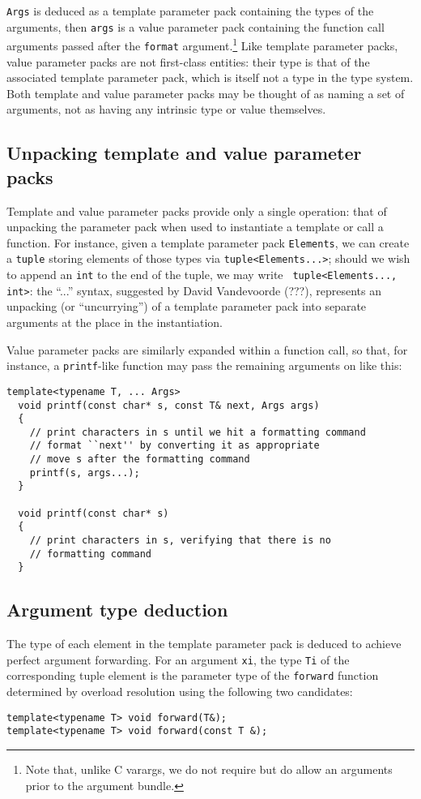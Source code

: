 \documentclass{article}
\begin{document}
{\tt Args} is deduced as a template parameter pack containing the types of
the arguments, then {\tt args} is a value parameter pack containing
the function call arguments passed after the {\tt format}
argument.\footnote{Note that, unlike C varargs, we do not require but
  do allow an arguments prior to the argument bundle.} Like template
parameter packs, value parameter packs are not first-class entities:
their type is that of the associated template parameter pack, which is
itself not a type in the type system. Both template and value
parameter packs may be thought of as naming a set of arguments, not as
having any intrinsic type or value themselves.

\subsection{Unpacking template and value parameter packs}
Template and value parameter packs provide only a single operation:
that of unpacking the parameter pack when used to instantiate a
template or call a function. For instance, given a template parameter
pack {\tt Elements}, we can create a {\tt tuple} storing elements of
those types via {\tt tuple<Elements...>}; should we wish to append an
{\tt int} to the end of the tuple, we may write {\tt
  tuple<Elements..., int>}: the ``...'' syntax, suggested
by David Vandevoorde (???), represents an unpacking (or
``uncurrying'') of a template parameter pack into separate
arguments at the place in the instantiation.

Value parameter packs are similarly expanded within a function call,
so that, for instance, a {\tt printf}-like function may pass the
remaining arguments on like this:
\begin{verbatim}
template<typename T, ... Args>
  void printf(const char* s, const T& next, Args args)
  {
    // print characters in s until we hit a formatting command
    // format ``next'' by converting it as appropriate
    // move s after the formatting command
    printf(s, args...);
  }

  void printf(const char* s)
  {
    // print characters in s, verifying that there is no 
    // formatting command
  }
\end{verbatim}

\subsection{Argument type deduction}
The type of each element in the template parameter pack is deduced to
achieve perfect argument forwarding. For an argument {\tt xi}, the
type {\tt Ti} of the corresponding tuple element is the parameter type
of the {\tt forward} function determined by overload resolution using
the following two candidates:
\begin{verbatim}
template<typename T> void forward(T&);
template<typename T> void forward(const T &);
\end{verbatim}
\end{document}
